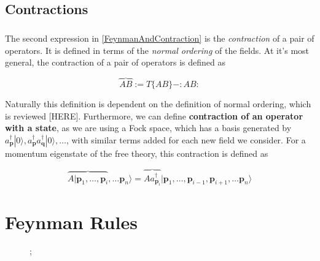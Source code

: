 \documentclass[12pt]{report}
\begin{document}
\section{Contractions}

\paragraph{} The second expression in \eqref{FeynmanAndContraction} is the \textit{contraction} of a pair of operators. It is defined in terms of the \textit{normal ordering} of the fields. At it's most general, the contraction of a pair of operators is defined as

	\begin{equation}
		\overbrace{AB} := T\{AB\} - :AB:
	\end{equation}

Naturally this definition is dependent on the definition of normal ordering, which is reviewed [HERE]. Furthermore, we can define \textbf{contraction of an operator with a state}, as we are using a Fock space, which has a basis generated by $a^\dagger_\mathbf{p}|0\rangle, a^\dagger_\mathbf{p}a^\dagger_\mathbf{q}|0\rangle,\ldots$, with similar terms added for each new field we consider. For a momentum eigenstate of the free theory, this contraction is defined as

	\begin{equation}
		\overbrace{A|\mathbf{p}_1,\ldots,\mathbf{p}_i} ,\ldots \mathbf{p}_n \rangle
		= \overbrace{Aa^\dagger_{\mathbf{p}_i}} |\mathbf{p}_1,\ldots,\mathbf{p}_{i-1},\mathbf{p}_{i+1} ,\ldots \mathbf{p}_n \rangle
	\end{equation}

\chapter{Feynman Rules}

\begin{figure}
\centering
	;
\end{figure}
\end{document}
